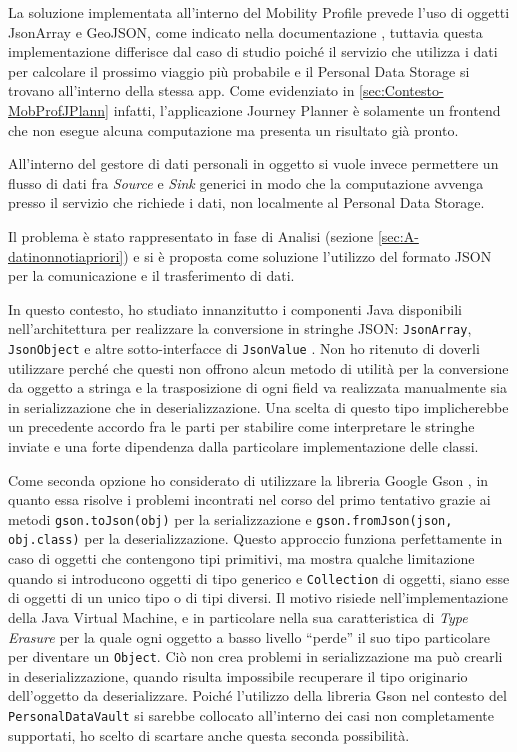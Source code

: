 La soluzione implementata all’interno del Mobility Profile prevede l’uso di oggetti JsonArray e GeoJSON, come indicato nella documentazione  \cite{githubmobilityprofilespecification}, tuttavia questa implementazione differisce dal caso di studio poich\'e il servizio che utilizza i dati per calcolare il prossimo viaggio pi\`u probabile e il Personal Data Storage si trovano all’interno della stessa app. Come evidenziato in \ref{sec:Contesto-MobProfJPlann} infatti, l’applicazione Journey Planner \`e solamente un frontend che non esegue alcuna computazione ma presenta un risultato gi\`a pronto.

All’interno del gestore di dati personali in oggetto si vuole invece permettere un flusso di dati fra \textit{Source} e \textit{Sink} generici in modo che la computazione avvenga presso il servizio che richiede i dati, non localmente al Personal Data Storage.

Il problema \`e stato rappresentato in fase di Analisi (sezione \ref{sec:A-datinonnotiapriori}) e si \`e proposta come soluzione l’utilizzo del formato JSON per la comunicazione e il trasferimento di dati.

In questo contesto, ho studiato innanzitutto i componenti Java disponibili nell’architettura per realizzare la conversione in stringhe JSON: \texttt{JsonArray}, \texttt{JsonObject} e altre sotto-interfacce di \texttt{JsonValue} \cite{java8api}. Non ho ritenuto di doverli utilizzare perch\'e che questi non offrono alcun metodo di utilit\`a per la conversione da oggetto a stringa e la trasposizione di ogni field va realizzata manualmente sia in serializzazione che in deserializzazione. Una scelta di questo tipo implicherebbe un precedente accordo fra le parti per stabilire come interpretare le stringhe inviate e una forte dipendenza dalla particolare implementazione delle classi.

Come seconda opzione ho considerato di utilizzare la libreria Google Gson \cite{googlegson}, in quanto essa risolve i problemi incontrati nel corso del primo tentativo grazie ai metodi \texttt{gson.toJson(obj)} per la serializzazione e \texttt{gson.fromJson(json, obj.class)} per la deserializzazione. Questo approccio funziona perfettamente in caso di oggetti che contengono tipi primitivi, ma mostra qualche limitazione quando si introducono oggetti di tipo generico e \texttt{Collection} di oggetti, siano esse di oggetti di un unico tipo o di tipi diversi. Il motivo risiede nell’implementazione della Java Virtual Machine, e in particolare nella sua caratteristica di \textit{Type Erasure} per la quale ogni oggetto a basso livello “perde” il suo tipo particolare per diventare un \texttt{Object}. Ci\`o non crea problemi in serializzazione ma pu\`o crearli in deserializzazione, quando risulta impossibile recuperare il tipo originario dell’oggetto da deserializzare. Poich\'e l’utilizzo della libreria Gson nel contesto del \texttt{PersonalDataVault} si sarebbe collocato all’interno dei casi non completamente supportati, ho scelto di scartare anche questa seconda possibilit\`a.

